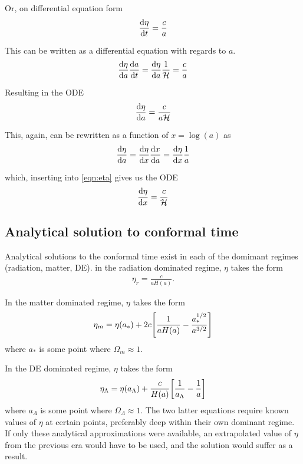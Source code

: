 \documentclass[10pt, a4paper]{article}
\begin{document}
Or, on differential equation form
\begin{equation}
    \dv{\eta}{t} = \frac{c}{a}
\end{equation}

This can be written as a differential equation with regards to $a$.
\begin{equation*}
    \dv{\eta}{a}\dv{a}{t} = \dv{\eta}{a}\frac{1}{\mathcal{H}} = \frac{c}{a}
\end{equation*}

Resulting in the ODE
\begin{align}\label{eqn:eta}
    \dv{\eta}{a} = \frac{c}{a\mathcal{H}}
\end{align}

This, again, can be rewritten as a function of $x = \log(a)$ as
\begin{align*}
    \dv{\eta}{a} = \dv{\eta}{x}\dv{x}{a} = \dv{\eta}{x}\frac{1}{a}
\end{align*}

which, inserting into \ref{eqn:eta} gives us the ODE
\begin{align}\label{eqn:etaODE}
    \dv{\eta}{x} = \frac{c}{\mathcal{H}}
\end{align}


\subsection{Analytical solution to conformal time}
Analytical solutions to the conformal time exist in each of the domimant regimes (radiation, matter, DE). in the radiation dominated regime, $\eta$ takes the form
\begin{align}
    \eta_r = \frac{c}{aH(a)}.
\end{align}

In the matter dominated regime, $\eta$ takes the form
\begin{align}
    \eta_m = \eta(a_*) + 2c\qty[\frac{1}{aH(a)} - \frac{a_*^{1/2}}{a^{3/2}}]
\end{align}
where $a_*$ is some point where $\Omega_m \approx 1$.

In the DE dominated regime, $\eta$ takes the form
\begin{align}
    \eta_\Lambda = \eta(a_\Lambda) + \frac{c}{H(a)}\qty[\frac{1}{a_\Lambda} - \frac{1}{a}]
\end{align}
where $a_\Lambda$ is some point where $\Omega_\Lambda \approx 1$. The two latter equations require known values of $\eta$ at certain points, preferably deep within their own dominant regime. If only these analytical approximations were available, an extrapolated value of $\eta$ from the previous era would have to be used, and the solution would suffer as a result.
\end{document}
